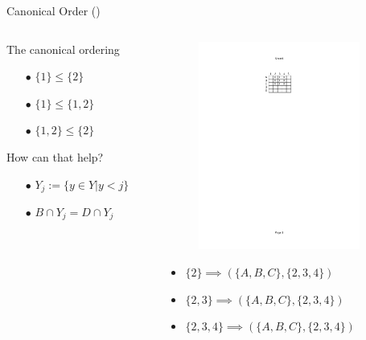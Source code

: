 \documentclass[pdf,xcolor=table]{beamer}
\begin{document}
\begin{frame}[t]{Canonical Order (\cite{Andrews2015})}
    \begin{columns}
        \begin{column}{0.4\textwidth}
            The canonical ordering
                \begin{itemize}
                    \item[$\bullet$] $\{1\} \leq \{2\}$
                    \item[$\bullet$] $\{1\} \leq \{1, 2\}$
                    \item[$\bullet$] $\{1, 2\} \leq \{2\}$
                \end{itemize}
                How can that help?
                \begin{itemize}
                    \item[$\bullet$] $Y_j := \{y \in Y | y < j\}$
                    \item[$\bullet$] $B \cap Y_j = D \cap Y_j$
                \end{itemize}
        \end{column}
        \begin{column}{0.6\textwidth}
            \begin{figure}
                \centering
                \includegraphics[width=150pt,trim=11cm 28cm 11cm 5cm, clip]{cannonical_example.png}
            \end{figure}
            \begin{itemize}
                \item $\{2\} \implies (\{A, B, C\}, \{2, 3, 4\})$
                \item $\{2, 3\} \implies (\{A, B, C\}, \{2, 3, 4\})$
                \item $\{2, 3, 4\} \implies (\{A, B, C\}, \{2, 3, 4\})$
            \end{itemize}
        \end{column}
    \end{columns}
\end{frame}
\end{document}
